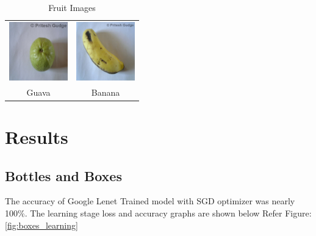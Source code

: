 \documentclass[10pt,journal,compsoc]{IEEEtran}
\begin{document}
\begin{table}[h]
\caption{Fruit Images}
\label{table:fruit_table}
\begin{center}
\begin{tabular}{|c|c|}
\hline
      \includegraphics[width=1in]{images/Guava__395}
 &    \includegraphics[width=1in]{images/Banana__1661}
       \\
       Guava & Banana \\
\hline
\end{tabular}
\end{center}
\end{table}


%
%

\section{Results}
\subsection{Bottles and Boxes}
The accuracy of Google Lenet Trained model with SGD optimizer was nearly 100\%. The learning stage loss and accuracy graphs are shown below Refer Figure: \ref{fig:boxes_learning} 
\end{document}
